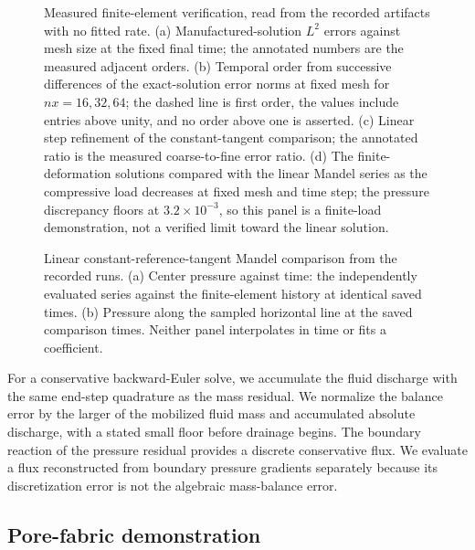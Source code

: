 \begin{figure}[htbp]
 \centering
 \caption{Measured finite-element verification, read from the recorded
artifacts with no fitted rate. (a) Manufactured-solution \(L^2\) errors
against mesh size at the fixed final time; the annotated numbers are the
measured adjacent orders. (b) Temporal order from successive differences of
the exact-solution error norms at fixed mesh for \(nx=16,32,64\); the
dashed line is first order, the values include entries above unity, and no
order above one is asserted. (c) Linear step refinement of the
constant-tangent comparison; the annotated ratio is the measured
coarse-to-fine error ratio. (d) The finite-deformation solutions compared
with the linear Mandel series as the compressive load decreases at fixed
mesh and time step; the pressure discrepancy floors at
\(3.2\times10^{-3}\), so this panel is a finite-load demonstration, not a
verified limit toward the linear solution.}
 \label{fig:fe-verification}
\end{figure}

\begin{figure}[htbp]
 \centering
 \caption{Linear constant-reference-tangent Mandel comparison from the
recorded runs. (a) Center pressure against time: the independently
evaluated series against the finite-element history at identical saved
times. (b) Pressure along the sampled horizontal line at the saved
comparison times. Neither panel interpolates in time or fits a coefficient.}
 \label{fig:fe-reference-comparison}
\end{figure}

For a conservative backward-Euler solve, we accumulate the fluid discharge
with the same end-step quadrature as the mass residual. We normalize the
balance error by the larger of the mobilized fluid mass and accumulated
absolute discharge, with a stated small floor before drainage begins.
The boundary reaction of the pressure residual provides a discrete
conservative flux. We evaluate a flux reconstructed from boundary pressure
gradients separately because its discretization error is not the algebraic
mass-balance error.

\subsection{Pore-fabric demonstration}
\label{sec:fe-fabric}

